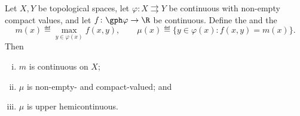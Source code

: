 \begin{theorem}\label{thm:berge-maximum}
	Let $X,Y$ be topological spaces, let
	$\varphi\colon X\rightrightarrows Y$ be continuous with non-empty compact
	values, and let $f\colon\gph\varphi\to\R$ be continuous. Define the
	 and the 
	\begin{equation}\label{eq:berge-objects}
		m(x)\eqdef\max_{y\in\varphi(x)}f(x,y),
		\qquad
		\mu(x)\eqdef\{y\in\varphi(x) : f(x,y)=m(x)\} .
	\end{equation}
	Then
	\begin{enumerate}[(i)]
		\item $m$ is continuous on $X$;
		\item $\mu$ is non-empty- and compact-valued; and
		\item $\mu$ is upper hemicontinuous.
	\end{enumerate}
\end{theorem}

